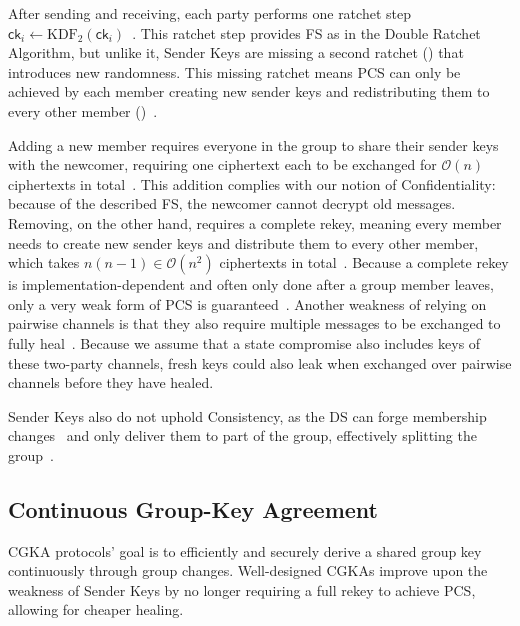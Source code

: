 \documentclass[conference]{IEEEtran}
\begin{document}
After sending and receiving, each party performs one ratchet step $\mathsf{ck}_i \leftarrow \mathrm{KDF}_2(\mathsf{ck}_i)$~\cite{balbasWhatsUppSenderKeys2023}.
This ratchet step provides \ac{FS} as in the Double Ratchet Algorithm, but unlike it, Sender Keys are missing a second ratchet () that introduces new randomness.
This missing ratchet means \ac{PCS} can only be achieved by each member creating new sender keys and redistributing them to every other member ()~\cite{balbasWhatsUppSenderKeys2023}.

Adding a new member requires everyone in the group to share their sender keys with the newcomer, requiring one ciphertext each to be exchanged for $\mathcal{O}(n)$ ciphertexts in total~\cite{balbasWhatsUppSenderKeys2023,albrechtFormalAnalysisMultidevice2025}.
This addition complies with our notion of Confidentiality: because of the described \ac{FS}, the newcomer cannot decrypt old messages.
Removing, on the other hand, requires a complete rekey, meaning every member needs to create new sender keys and distribute them to every other member, which takes $n(n-1) \in \mathcal{O}(n^2)$ ciphertexts in total~\cite{albrechtFormalAnalysisMultidevice2025,balbasWhatsUppSenderKeys2023}.
Because a complete rekey is implementation-dependent and often only done after a group member leaves, only a very weak form of \ac{PCS} is guaranteed~\cite{balbasWhatsUppSenderKeys2023}.
Another weakness of relying on pairwise channels is that they also require multiple messages to be exchanged to fully heal~\cite{balbasWhatsUppSenderKeys2023}.
Because we assume that a state compromise also includes keys of these two-party channels, fresh keys could also leak when exchanged over pairwise channels before they have healed.

Sender Keys also do not uphold Consistency, as the \ac{DS} can forge membership changes~\cite{albrechtFormalAnalysisMultidevice2025} and only deliver them to part of the group, effectively splitting the group~\cite{balbasWhatsUppSenderKeys2023}.

\subsection{Continuous Group-Key Agreement}\label{sec:cgka}
\acf{CGKA} protocols' goal is to efficiently and securely derive a shared group key continuously through group changes.
Well-designed \acp{CGKA} improve upon the weakness of Sender Keys by no longer requiring a full rekey to achieve \ac{PCS}, allowing for cheaper healing.
\end{document}
